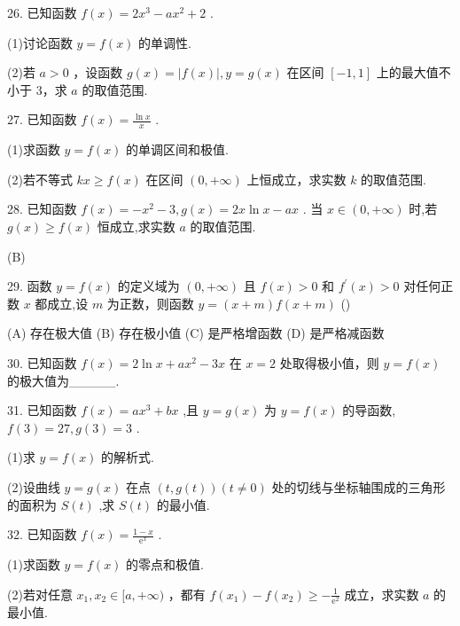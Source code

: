 \documentclass[10pt]{article}
\begin{document}
26. 已知函数 \(f\left( x\right)  = 2{x}^{3} - a{x}^{2} + 2\) .

(1)讨论函数 \(y = f\left( x\right)\) 的单调性.

(2)若 \(a > 0\) ，设函数 \(g\left( x\right)  = \left| {f\left( x\right) }\right| ,y = g\left( x\right)\) 在区间 \(\left\lbrack  {-1,1}\right\rbrack\) 上的最大值不小于 3，求 \(a\) 的取值范围.

27. 已知函数 \(f\left( x\right)  = \frac{\ln x}{x}\) .

(1)求函数 \(y = f\left( x\right)\) 的单调区间和极值.

(2)若不等式 \({kx} \geq  f\left( x\right)\) 在区间 \(\left( {0, + \infty }\right)\) 上恒成立，求实数 \(k\) 的取值范围.

28. 已知函数 \(f\left( x\right)  =  - {x}^{2} - 3,g\left( x\right)  = {2x}\ln x - {ax}\) . 当 \(x \in  \left( {0, + \infty }\right)\) 时,若 \(g\left( x\right)  \geq  f\left( x\right)\) 恒成立,求实数 \(a\) 的取值范围.

(B)

29. 函数 \(y = f\left( x\right)\) 的定义域为 \(\left( {0, + \infty }\right)\) 且 \(f\left( x\right)  > 0\) 和 \({f}^{\prime }\left( x\right)  > 0\) 对任何正数 \(x\) 都成立,设 \(m\) 为正数，则函数 \(y = \left( {x + m}\right) f\left( {x + m}\right)\) ()

(A) 存在极大值 (B) 存在极小值 (C) 是严格增函数 (D) 是严格减函数

30. 已知函数 \(f\left( x\right)  = 2\ln x + a{x}^{2} - {3x}\) 在 \(x = 2\) 处取得极小值，则 \(y = f\left( x\right)\) 的极大值为\_\_\_\_\_.

31. 已知函数 \(f\left( x\right)  = a{x}^{3} + {bx}\) ,且 \(y = g\left( x\right)\) 为 \(y = f\left( x\right)\) 的导函数, \(f\left( 3\right)  = {27},g\left( 3\right)  = 3\) .

(1)求 \(y = f\left( x\right)\) 的解析式.

(2)设曲线 \(y = g\left( x\right)\) 在点 \(\left( {t,g\left( t\right) }\right) \left( {t \neq  0}\right)\) 处的切线与坐标轴围成的三角形的面积为 \(S\left( t\right)\) ,求 \(S\left( t\right)\) 的最小值.

32. 已知函数 \(f\left( x\right)  = \frac{1 - x}{{\mathrm{e}}^{x}}\) .

(1)求函数 \(y = f\left( x\right)\) 的零点和极值.

(2)若对任意 \({x}_{1},{x}_{2} \in  \lbrack a, + \infty )\) ，都有 \(f\left( {x}_{1}\right)  - f\left( {x}_{2}\right)  \geq   - \frac{1}{{\mathrm{e}}^{2}}\) 成立，求实数 \(a\) 的最小值.
\end{document}

